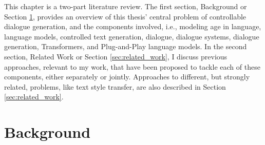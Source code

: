 
This chapter is a two-part literature review. The first section, Background or Section \ref{sec:background}, provides an overview of this thesis' central problem of controllable dialogue generation, and the components involved, i.e., 
modeling age in language, language models, controlled text generation, dialogue, dialogue systems, dialogue generation, Transformers, and Plug-and-Play language models. 
In the second section, Related Work or Section \ref{sec:related_work}, I discuss previous approaches, relevant to my work, that have been proposed to tackle each of these components, either separately or jointly. Approaches to different, but strongly related, problems, like text style transfer, are also described in Section \ref{sec:related_work}.

\section{Background}
\label{sec:background}



